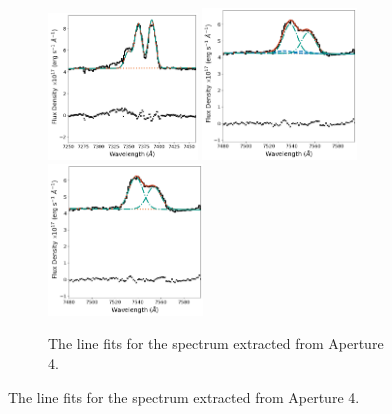 \begin{figure}
\begin{subfigure}[t]{0.9\linewidth}
        \hspace{1.42cm}
        \includegraphics[width=0.435\textwidth]{figures/muse_f13451_1232/line_fits/ap4_halpha_no_nuclear_model.png}
        \vfill
        \includegraphics[width=0.45\textwidth]{figures/muse_f13451_1232/line_fits/ap4_sii.png}
        \hspace{1.3cm}
        \includegraphics[width=0.45\textwidth]{figures/muse_f13451_1232/line_fits/ap4_sii_no_nuclear_model.png}
        \label{fig: muse_f13451_1232: analysis_and_results: extended_emission: ap4_line_fits}
        \caption{The line fits for the spectrum extracted from Aperture 4.}
    \end{subfigure}
\end{figure}
